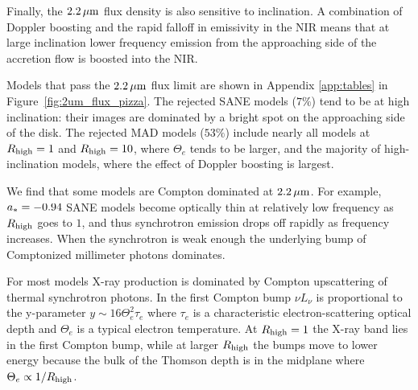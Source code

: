 Finally, the $2.2\,\mu\mathrm{m}$ flux density is also sensitive to inclination.  A combination of Doppler boosting and the rapid falloff in emissivity in the NIR means that at large inclination lower frequency emission from the approaching side of the accretion flow is boosted into the NIR. 

Models that pass the $2.2\,\mu\mathrm{m}$ flux limit are shown in Appendix \ref{app:tables} in Figure~\ref{fig:2um_flux_pizza}.
The rejected SANE models ($7\%$) tend to be at high inclination: their images are dominated by a bright spot on the approaching side of the disk.
The rejected MAD models ($53\%$) include nearly all models at $R_\mathrm{high} = 1$ and $R_\mathrm{high} = 10$, where $\Theta_e$ tends to be larger, and the majority of high-inclination models, where the effect of Doppler boosting is largest.

We find that some models are Compton dominated at $2.2\,\mu\mathrm{m}$.
For example, $a_* = -0.94$ SANE models become optically thin at relatively low frequency as $R_\mathrm{high}$ goes to $1$, and thus synchrotron emission drops off rapidly as frequency increases.  When the synchrotron is weak enough the underlying bump of Comptonized millimeter photons dominates.  


For most models X-ray production is dominated by Compton upscattering of thermal synchrotron photons.
In the first Compton bump $\nu L_\nu$ is proportional to the y-parameter $y \sim 16 \Theta_e^2 \tau_e$ where $\tau_e$ is a characteristic electron-scattering optical depth and $\Theta_e$ is a typical electron temperature.
At $R_\mathrm{high} = 1$ the X-ray band lies in the first Compton bump, while at larger $R_\mathrm{high}$ the bumps move to lower energy because the bulk of the Thomson depth is in the midplane where $\Theta_e \propto 1/R_\mathrm{high}$.

